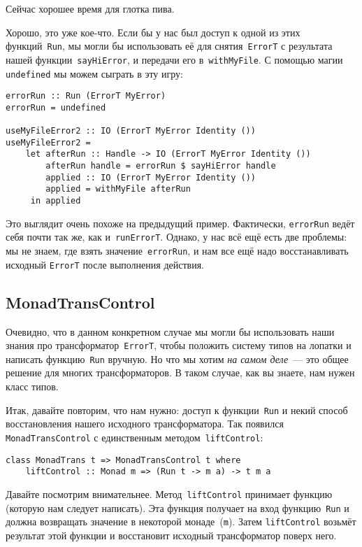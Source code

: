 \begin{remark}
Сейчас хорошее время для глотка пива.
\end{remark}

Хорошо, это уже кое-что. Если бы у нас был доступ к одной из
этих функций~\lstinline'Run', мы могли бы использовать её для
снятия~\lstinline'ErrorT' с результата нашей функции~\lstinline'sayHiError', и
передачи его в~\lstinline'withMyFile'. С помощью магии \lstinline'undefined' мы
можем сыграть в эту игру:

\begin{lstlisting}
errorRun :: Run (ErrorT MyError)
errorRun = undefined

useMyFileError2 :: IO (ErrorT MyError Identity ())
useMyFileError2 =
    let afterRun :: Handle -> IO (ErrorT MyError Identity ())
        afterRun handle = errorRun $ sayHiError handle
        applied :: IO (ErrorT MyError Identity ())
        applied = withMyFile afterRun
     in applied
\end{lstlisting}

Это выглядит очень похоже на предыдущий пример. Фактически,
\lstinline'errorRun' ведёт себя почти так же, как и~\lstinline'runErrorT'.
Однако, у нас всё ещё есть две проблемы: мы не знаем, где взять
значение~\lstinline'errorRun', и нам все ещё надо восстанавливать исходный
\lstinline'ErrorT' после выполнения действия.

\subsection{MonadTransControl}
Очевидно, что в данном конкретном случае мы могли бы использовать наши знания
про трансформатор~\lstinline'ErrorT', чтобы положить систему типов на лопатки и
написать функцию~\lstinline'Run' вручную. Но что мы хотим \emph{на самом
 деле}~--- это общее решение для многих трансформаторов. В таком случае, как
вы знаете, нам нужен класс типов.

Итак, давайте повторим, что нам нужно: доступ к функции~\lstinline'Run' и некий
способ восстановления нашего исходного трансформатора. Так появился
\lstinline'MonadTransControl' с единственным методом~\lstinline'liftControl':

\begin{lstlisting}
class MonadTrans t => MonadTransControl t where
    liftControl :: Monad m => (Run t -> m a) -> t m a
\end{lstlisting}

Давайте посмотрим внимательнее. Метод~\lstinline'liftControl' принимает функцию
(которую нам следует написать). Эта функция получает на вход
функцию~\lstinline'Run' и должна возвращать значение в некоторой
монаде~(\lstinline'm'). Затем \lstinline'liftControl' возьмёт результат этой
функции и восстановит исходный трансформатор поверх него.

